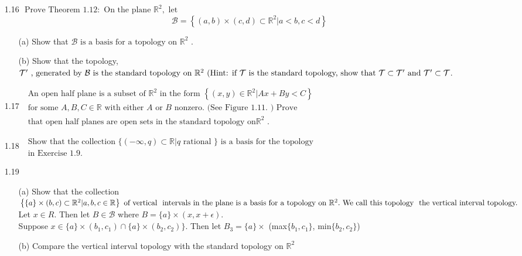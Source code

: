 \documentclass[12pt]{article}
\begin{document}
\begin{enumerate}
	\item[1.16] $\text { Prove Theorem } 1.12 : \text { On the plane } \mathbb { R } ^ { 2 } , \text { let } $
		\[\mathcal { B } = \left\{ ( a , b ) \times ( c , d ) \subset \mathbb { R } ^ { 2 } | a < b , c < d \right\}\]
	
	\begin{enumerate}
		\item[(a)] Show that $ \mathcal { B } \text { is a basis for a topology on } \mathbb { R } ^ { 2 } \text { . } $
		\item[(b)]  Show that the topology,  $ \mathcal { T } ^ { \prime } \text { , generated by } \mathcal { B } \text { is the standard topology on } \mathbb { R } ^ { 2 } \text { (Hint: if } \mathcal { T } \text { is the } \\ \text{standard topology, show that } \mathcal { T } \subset \mathcal { T } ^ { \prime } \text { and } \mathcal { T } ^ { \prime } \subset \mathcal { T }$.
	\end{enumerate}
	
	\item[1.17] $ \begin{array} { l } { \text { An open half plane is a subset of } \mathbb { R } ^ { 2 } \text { in the form } \left\{ ( x , y ) \in \mathbb { R } ^ { 2 } | A x + B y < C \right\} } \\ { \text { for some } A , B , C \in \mathbb { R } \text { with either } A \text { or } B \text { nonzero. (See Figure } 1.11 . \text { ) Prove } } \\ { \text { that open half planes are open sets in the standard topology on} \mathbb { R }^2 \text { . } } \end{array} $
	
	\item[1.18]$ \begin{array} { l } { \text { Show that the collection } \{ ( - \infty , q ) \subset \mathbb { R } | q \text { rational } \} \text { is a basis for the topology } } \\ { \text { in Exercise } 1.9 . } \end{array} $
	
	\item[1.19] 
	\begin{enumerate}
		\item[(a)]  Show that the collection $ \left\{ \{ a \} \times ( b , c ) \subset \mathbb { R } ^ { 2 } | a , b , c \in \mathbb { R } \right\} \text { of vertical } \text { intervals in the plane is a} \\ \text{ basis for a topology on } \mathbb { R } ^ { 2 } . \text { We call this topology } \text { the vertical interval topology. } $\\
		Let $ x\in R $. Then let $ B\in \mathcal {B} $ where $ B = \{a\} \times (x,x+\epsilon) $.\\
		Suppose $ x  \in \{a\}\times(b_1,c_1)\cap\{a\}\times(b_2,c_2)\} $. Then let $ B_3 = \{a\} \times $ (max$ \{b_1,c_1\} $, min$ \{b_2,c_2\} $)
		\item[(b)] Compare the vertical interval topology with the standard topology on $ \mathbb {R}^2 $
	\end{enumerate}
\end{enumerate}
 
\end{document}
